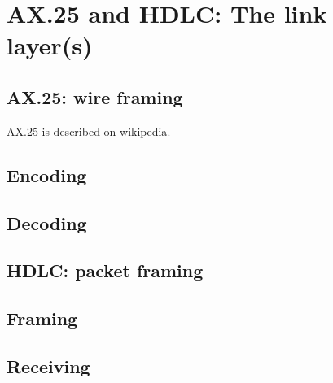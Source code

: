 \chapter{AX.25 and HDLC: The link layer(s)}

\section{AX.25: wire framing}
AX.25 is described on wikipedia\cite{WikiAX25}.

\section{Encoding}
\section{Decoding}



\section{HDLC: packet framing}
\section{Framing}
\section{Receiving}

